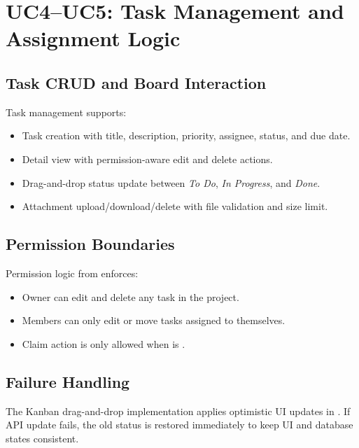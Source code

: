 \section{UC4--UC5: Task Management and Assignment Logic}




\subsection{Task CRUD and Board Interaction}

Task management supports:
\begin{itemize}
    \item Task creation with title, description, priority, assignee, status, and due date.
    \item Detail view with permission-aware edit and delete actions.
    \item Drag-and-drop status update between \textit{To Do}, \textit{In Progress}, and \textit{Done}.
    \item Attachment upload/download/delete with file validation and size limit.
\end{itemize}

\subsection{Permission Boundaries}

Permission logic from  enforces:
\begin{itemize}
    \item Owner can edit and delete any task in the project.
    \item Members can only edit or move tasks assigned to themselves.
    \item Claim action is only allowed when  is .
\end{itemize}

\subsection{Failure Handling}

The Kanban drag-and-drop implementation applies optimistic UI updates in .
If API update fails, the old status is restored immediately to keep UI and database states consistent.


